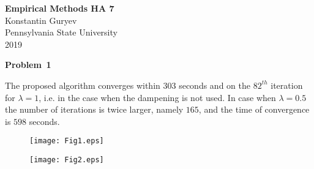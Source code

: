 \documentclass[a4paper,12pt]{article}
\begin{document}
\maketitle \hrulefill
{}

\begin{center}

\textbf {\Large{Empirical Methods HA 7}}\\
Konstantin Guryev\\
Pennsylvania State University\\
2019
\end{center}



\textbf{Problem \textnumero \,1 }

\vspace{\baselineskip}
The proposed algorithm converges within $303$ seconds and on the $82^{th}$ iteration for $\lambda = 1$, i.e. in the case when the dampening is not used. In case when $\lambda = 0.5$ the number of iterations is twice larger, namely $165$, and the time of convergence is $598$ seconds.

\begin{figure}[h]
\centering
\texttt{[image: Fig1.eps]}
\end{figure}
\vspace{\baselineskip}

\begin{figure}[h]
\centering
\texttt{[image: Fig2.eps]}
\end{figure}
\vspace{\baselineskip}
\end{document}

